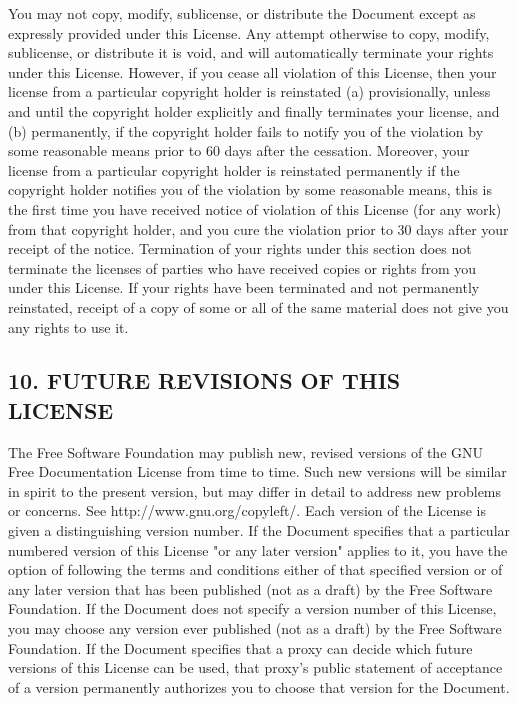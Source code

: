 You may not copy, modify, sublicense, or distribute the Document except as expressly provided under this License. Any attempt otherwise to copy, modify, sublicense, or distribute it is void, and will automatically terminate your rights under this License.
However, if you cease all violation of this License, then your license from a particular copyright holder is reinstated (a) provisionally, unless and until the copyright holder explicitly and finally terminates your license, and (b) permanently, if the copyright holder fails to notify you of the violation by some reasonable means prior to 60 days after the cessation.
Moreover, your license from a particular copyright holder is reinstated permanently if the copyright holder notifies you of the violation by some reasonable means, this is the first time you have received notice of violation of this License (for any work) from that copyright holder, and you cure the violation prior to 30 days after your receipt of the notice.
Termination of your rights under this section does not terminate the licenses of parties who have received copies or rights from you under this License. If your rights have been terminated and not permanently reinstated, receipt of a copy of some or all of the same material does not give you any rights to use it.

\subsection{10. FUTURE REVISIONS OF THIS LICENSE}


The Free Software Foundation may publish new, revised versions of the GNU Free Documentation License from time to time. Such new versions will be similar in spirit to the present version, but may differ in detail to address new problems or concerns. See http://www.gnu.org/copyleft/.
Each version of the License is given a distinguishing version number. If the Document specifies that a particular numbered version of this License "or any later version" applies to it, you have the option of following the terms and conditions either of that specified version or of any later version that has been published (not as a draft) by the Free Software Foundation. If the Document does not specify a version number of this License, you may choose any version ever published (not as a draft) by the Free Software Foundation. If the Document specifies that a proxy can decide which future versions of this License can be used, that proxy's public statement of acceptance of a version permanently authorizes you to choose that version for the Document.

